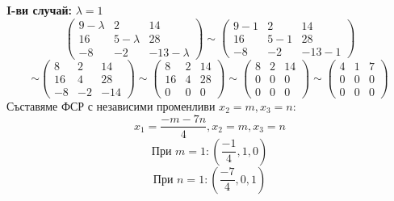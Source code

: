 \documentclass{article}
\begin{document}
\textbf{I-ви случай:} $\lambda=1$
\[
    \left(\begin{array}{ccc}
            9-\lambda & 2         & 14          \\
            16        & 5-\lambda & 28          \\
            -8        & -2        & -13-\lambda
        \end{array}
    \right)
    \sim\left(\begin{array}{ccc}
            9-1 & 2   & 14    \\
            16  & 5-1 & 28    \\
            -8  & -2  & -13-1
        \end{array}
    \right)
\]
\[
    \sim\left(\begin{array}{ccc}
8  & 2  & 14  \\
16 & 4  & 28  \\
-8 & -2 & -14
\end{array}
\right)
    \sim\left(\begin{array}{ccc}
            8  & 2 & 14 \\
            16 & 4 & 28 \\
            0  & 0 & 0
        \end{array}
    \right)
    \sim\left(\begin{array}{ccc}
            8 & 2 & 14 \\
            0 & 0 & 0  \\
            0 & 0 & 0
        \end{array}
    \right)
    \sim\left(\begin{array}{ccc}
            4 & 1 & 7 \\
            0 & 0 & 0 \\
            0 & 0 & 0
        \end{array}
    \right)
\]
\newpage
Съставяме ФСР с независими променливи $x_2=m, x_3=n$:
\[
x_1=\frac{-m-7n}{4}, x_2=m, x_3=n
\]
\[
\text{При } m=1: (\frac{-1}{4}, 1, 0)
\]
\[
\text{При } n=1: (\frac{-7}{4}, 0, 1)
\]
\end{document}
